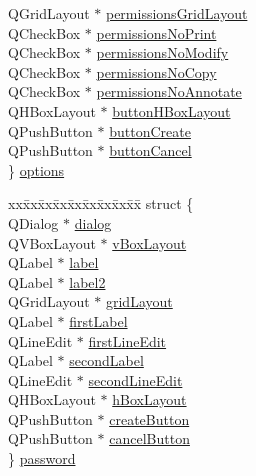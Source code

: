 \begin{CompactItemize}
\begin{tabbing}
\>QGridLayout $\ast$ \hyperlink{classPDFOptions_r35}{permissionsGridLayout}\\
\>QCheckBox $\ast$ \hyperlink{classPDFOptions_r36}{permissionsNoPrint}\\
\>QCheckBox $\ast$ \hyperlink{classPDFOptions_r37}{permissionsNoModify}\\
\>QCheckBox $\ast$ \hyperlink{classPDFOptions_r38}{permissionsNoCopy}\\
\>QCheckBox $\ast$ \hyperlink{classPDFOptions_r39}{permissionsNoAnnotate}\\
\>QHBoxLayout $\ast$ \hyperlink{classPDFOptions_r40}{buttonHBoxLayout}\\
\>QPushButton $\ast$ \hyperlink{classPDFOptions_r41}{buttonCreate}\\
\>QPushButton $\ast$ \hyperlink{classPDFOptions_r42}{buttonCancel}\\
\} \hyperlink{classPDFOptions_r43}{options}\\

\end{tabbing}\item 
\begin{tabbing}
xx\=xx\=xx\=xx\=xx\=xx\=xx\=xx\=xx\=\kill
struct \{\\
\>QDialog $\ast$ \hyperlink{classPDFOptions_r44}{dialog}\\
\>QVBoxLayout $\ast$ \hyperlink{classPDFOptions_r45}{vBoxLayout}\\
\>QLabel $\ast$ \hyperlink{classPDFOptions_r46}{label}\\
\>QLabel $\ast$ \hyperlink{classPDFOptions_r47}{label2}\\
\>QGridLayout $\ast$ \hyperlink{classPDFOptions_r48}{gridLayout}\\
\>QLabel $\ast$ \hyperlink{classPDFOptions_r49}{firstLabel}\\
\>QLineEdit $\ast$ \hyperlink{classPDFOptions_r50}{firstLineEdit}\\
\>QLabel $\ast$ \hyperlink{classPDFOptions_r51}{secondLabel}\\
\>QLineEdit $\ast$ \hyperlink{classPDFOptions_r52}{secondLineEdit}\\
\>QHBoxLayout $\ast$ \hyperlink{classPDFOptions_r53}{hBoxLayout}\\
\>QPushButton $\ast$ \hyperlink{classPDFOptions_r54}{createButton}\\
\>QPushButton $\ast$ \hyperlink{classPDFOptions_r55}{cancelButton}\\
\} \hyperlink{classPDFOptions_r56}{password}\\

\end{tabbing}\end{CompactItemize}


